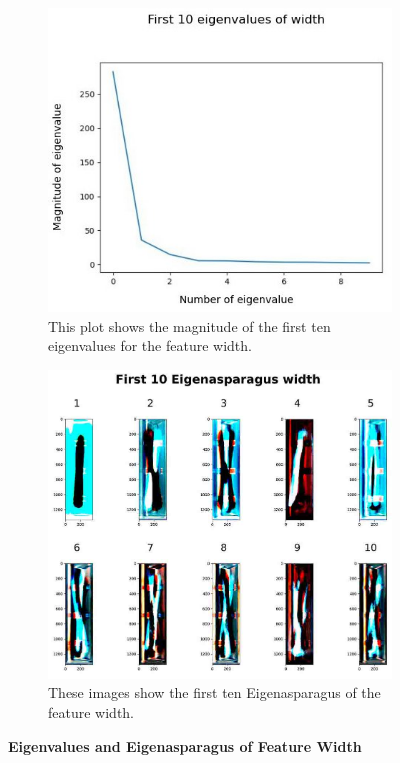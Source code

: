 \begin{figure}[!h]
	\centering
	\begin{subfigure}{0.7\textwidth}
		\includegraphics[width=0.9\linewidth]{Figures/chapter04/pca_width_graph.png} 
		\caption{This plot shows the magnitude of the first ten eigenvalues for the feature width.}
	\end{subfigure}
	\vspace{20pt}
	
	\begin{subfigure}{0.9\textwidth}
		\includegraphics[width=0.9\linewidth]{Figures/chapter04/pca_width.png}
		\caption{These images show the first ten Eigenasparagus of the feature width.}
	\end{subfigure}
    \caption[First Ten Eigenvalues and Eigenasparagus of Feature Width]{\textbf{Eigenvalues and Eigenasparagus of Feature Width}}
    \label{fig:PCAwidth}
\end{figure}

